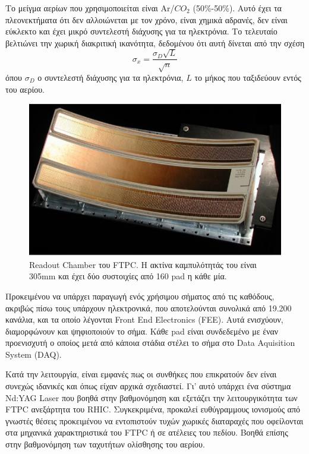 	 
	 Το μείγμα αερίων που χρησιμοποιείται είναι Ar/$CO_2$ (50\%-50\%). Αυτό έχει τα πλεονεκτήματα ότι δεν αλλοιώνεται με τον χρόνο, είναι χημικά αδρανές, δεν είναι εύκλεκτο και έχει μικρό συντελεστή διάχυσης για τα ηλεκτρόνια. Το τελευταίο βελτιώνει την χωρική διακριτική ικανότητα, δεδομένου ότι αυτή δίνεται από την σχέση 
	 	\begin{equation}\label{eq3.2}
	 		\sigma_x = \frac{\sigma_D\sqrt{L}}{\sqrt{n}}
	 	\end{equation}
	 όπου $\sigma_D$ ο συντελεστή διάχυσης για τα ηλεκτρόνια, $L$ το μήκος που ταξιδεύουν εντός του αερίου.
	 
	 \begin{figure}[h!]
	 	\centering 
	 	\includegraphics[scale=0.5]{STAR_Detectors/FTPC_readout_chamber}
	 	\caption{Readout Chamber του FTPC. Η ακτίνα καμπυλότητάς του είναι 305mm και έχει δύο συστοιχίες από 160 pad η κάθε μία. }
	 	\label{fig3.3}
	 \end{figure}
	 
	 Προκειμένου να υπάρχει παραγωγή ενός χρήσιμου σήματος από τις καθόδους,  ακριβώς πίσω τους υπάρχουν ηλεκτρονικά, που αποτελούνται συνολικά από 19.200 κανάλια, και τα οποίο λέγονται Front End Electronics (FEΕ). Αυτά ενισχύουν, διαμορφώνουν και ψηφιοποιούν το σήμα. Κάθε pad είναι συνδεδεμένο με έναν προενισχυτή ο οποίος μετά από κάποια στάδια στέλει το σήμα στο Data Aquisition System (DAQ).
	 
	 Κατά την λειτουργία, είναι εμφανές πως οι συνθήκες που επικρατούν δεν είναι συνεχώς ιδανικές και όπως είχαν αρχικά σχεδιαστεί. Γι' αυτό υπάρχει ένα σύστημα Nd:YAG Laser που βοηθά στην βαθμονόμηση και εξετάζει την λειτουργικότητα των FTPC ανεξάρτητα του RHIC. Συγκεκριμένα, προκαλεί ευθύγραμμους ιονισμούς από γνωστές θέσεις προκειμένου να εντοπιστούν τυχών χωρικές διαταραχές που οφείλονται στα μηχανικά χαρακτηριστικά του FTPC ή σε ατέλειες του πεδίου. Βοηθά επίσης στην βαθμονόμηση των ταχυτήτων ολίσθησης του αερίου.
	 	
